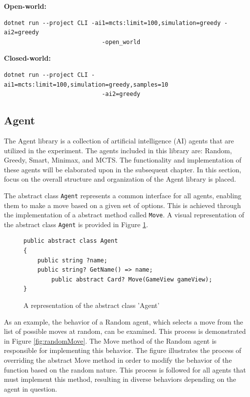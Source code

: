 \textbf{Open-world: }
\begin{lstlisting}
dotnet run --project CLI -ai1=mcts:limit=100,simulation=greedy -ai2=greedy 
							-open_world
\end{lstlisting}

\textbf{Closed-world: }
\begin{lstlisting}
dotnet run --project CLI -ai1=mcts:limit=100,simulation=greedy,samples=10 
							-ai2=greedy
\end{lstlisting}



\subsection{Agent}

The Agent library is a collection of artificial intelligence (AI) agents that are utilized in the experiment. The agents included in this library are: Random, Greedy, Smart, Minimax, and MCTS. The functionality and implementation of these agents will be elaborated upon in the subsequent chapter. In this section, focus on the overall structure and organization of the Agent library is placed.

The abstract class \texttt{Agent} represents a common interface for all agents, enabling them to make a move based on a given set of options. This is achieved through the implementation of a abstract method called \texttt{Move}. A visual representation of the abstract class \texttt{Agent} is provided in Figure \ref{fig:abstractClass}.

\begin{figure}[h]
\captionsetup{justification=centering}
\begin{lstlisting}
public abstract class Agent
{
	public string ?name;
	public string? GetName() => name;
    	public abstract Card? Move(GameView gameView);
}
\end{lstlisting}
\caption{A representation of the abstract class 'Agent'}
\label{fig:abstractClass}
\end{figure}

As an example, the behavior of a Random agent, which selects a move from the list of possible moves at random, can be examined. This process is demonstrated in Figure \ref{fig:randomMove}. The Move method of the Random agent is responsible for implementing this behavior. The figure illustrates the process of overriding the abstract Move method in order to modify the behavior of the function based on the random nature. This process is followed for all agents that must implement this method, resulting in diverse behaviors depending on the agent in question.
